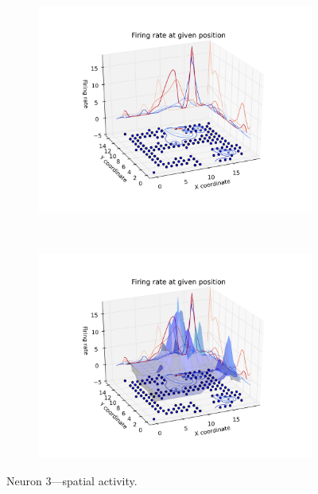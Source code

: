 \documentclass[11pt,a4paper,twocolumn]{article}
\begin{document}
\begin{figure}[h]
  \begin{subfigure}{.99\linewidth}\centering
    \includegraphics[width=1.1\textwidth]{figure8_a.png}
    \caption{\label{fig:3d_n3_a}}
  \end{subfigure}\\[1ex]
  \begin{subfigure}{.99\linewidth}\centering
    \includegraphics[width=1.1\textwidth]{figure8_b.png}
    \caption{\label{fig:3d_n3_b}}
  \end{subfigure}

  \caption{Neuron 3---spatial activity.\label{fig:3d_n3}}
\end{figure}
\end{document}
